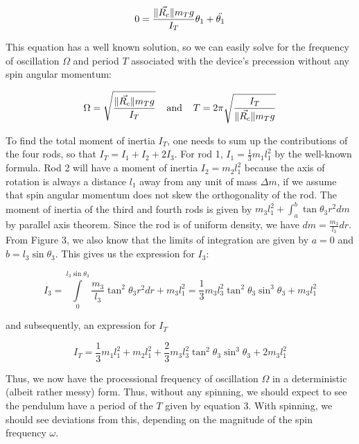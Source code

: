 \documentclass[12pt]{article}
\begin{document}
\begin{equation}
0 = {{\| \vec{R_c} \| m_T g } \over {I_T}} \theta_1 + \ddot{\theta_1}
\end{equation}

This equation has a well known solution, so we can easily solve for the frequency of oscillation $\Omega$ and period $T$ associated with the device's precession without any spin angular momentum: 

\begin{equation}
\Omega = \sqrt{{{\| \vec{R_c} \| m_T g } \over {I_T}}}  \hspace{0.4cm} \text{and} \hspace{0.4cm} T = 2 \pi \sqrt{{ {I_T} \over {\| \vec{R_c} \| m_T g }}}
\end{equation}

To find the total moment of inertia $I_T$, one needs to sum up the contributions of the four rods, so that $I_T = I_1 + I_2 + 2 I_3$. For rod 1, $I_1 = \frac{1}{3} m_1 l_1^2$ by the well-known formula. Rod 2 will have a moment of inertia $I_2 = m_2 l_1^2$ because the axis of rotation is always a distance $l_1$ away from any unit of mass $\Delta m$, if we assume that spin angular momentum does not skew the orthogonality of the rod. The moment of inertia of the third and fourth rods is given by $ m_3 l_1^2 + \int_a^b \tan \theta_3 r^2 dm $ by parallel axis theorem. Since the rod is of uniform density, we have $dm = \frac{m_3}{l_3}dr$. From Figure 3, we also know that the limits of integration are given by $a = 0$ and $ b = l_3 \sin \theta_3$. This gives us the expression for $I_3$: 

\begin{equation}
I_3 = \int \limits_{0}^{l_3 \sin \theta_3} \frac{m_3}{l_3} \tan^2 \theta_3 r^2 dr + m_3 l_1^2 = \frac{1}{3} m_3 l_3^2 \tan^2 \theta_3 \sin ^3 \theta_3 + m_3 l_1^2 
\end{equation}

and subsequently, an expression for $I_T$

\begin{equation}
I_T = \frac{1}{3} m_1 l_1^2 + m_2 l_1^2 + \frac{2}{3} m_3 l_3^2 \tan^2 \theta_3 \sin ^3 \theta_3 + 2 m_3 l_1^2
\end{equation}

Thus, we now have the processional frequency of oscillation $\Omega$ in a deterministic (albeit rather messy) form. Thus, without any spinning, we should expect to see the pendulum have a period of the $T$ given by equation 3. With spinning, we should see deviations from this, depending on the magnitude of the spin frequency $\omega$. 
\end{document}
